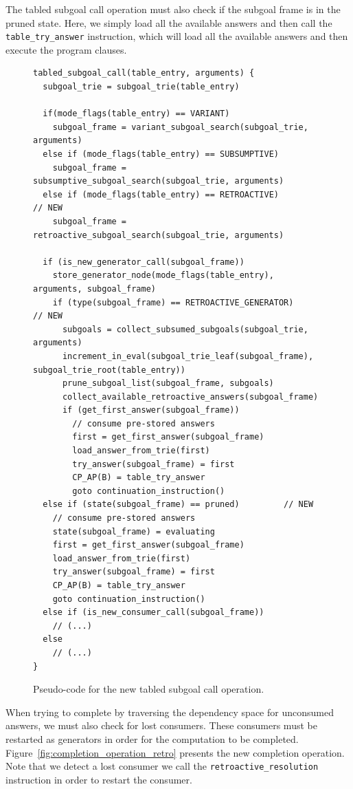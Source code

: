The tabled subgoal call operation must also check if the subgoal frame is in the pruned state. Here,
we simply load all the available answers and then call the \texttt{table\_try\_answer} instruction,
which will load all the available answers and then execute the program clauses.

\begin{figure}[ht]
\begin{Verbatim}
tabled_subgoal_call(table_entry, arguments) {
  subgoal_trie = subgoal_trie(table_entry)
  
  if(mode_flags(table_entry) == VARIANT)
    subgoal_frame = variant_subgoal_search(subgoal_trie, arguments)
  else if (mode_flags(table_entry) == SUBSUMPTIVE)
    subgoal_frame = subsumptive_subgoal_search(subgoal_trie, arguments)
  else if (mode_flags(table_entry) == RETROACTIVE)                 // NEW
    subgoal_frame = retroactive_subgoal_search(subgoal_trie, arguments)
  
  if (is_new_generator_call(subgoal_frame))
    store_generator_node(mode_flags(table_entry), arguments, subgoal_frame)
    if (type(subgoal_frame) == RETROACTIVE_GENERATOR)             // NEW
      subgoals = collect_subsumed_subgoals(subgoal_trie, arguments)
      increment_in_eval(subgoal_trie_leaf(subgoal_frame), subgoal_trie_root(table_entry))
      prune_subgoal_list(subgoal_frame, subgoals)
      collect_available_retroactive_answers(subgoal_frame)
      if (get_first_answer(subgoal_frame))
        // consume pre-stored answers
        first = get_first_answer(subgoal_frame)
        load_answer_from_trie(first)
        try_answer(subgoal_frame) = first
        CP_AP(B) = table_try_answer
        goto continuation_instruction()
  else if (state(subgoal_frame) == pruned)         // NEW
    // consume pre-stored answers
    state(subgoal_frame) = evaluating
    first = get_first_answer(subgoal_frame)
    load_answer_from_trie(first)
    try_answer(subgoal_frame) = first
    CP_AP(B) = table_try_answer
    goto continuation_instruction()
  else if (is_new_consumer_call(subgoal_frame))
    // (...)
  else
    // (...)
}
\end{Verbatim}
\caption{Pseudo-code for the new tabled subgoal call operation.}
\label{fig:tabled_subgoal_call_retro}
\end{figure}

When trying to complete by traversing the dependency space for unconsumed answers, we must
also check for lost consumers. These consumers must be restarted as generators in order for
the computation to be completed. Figure~\ref{fig:completion_operation_retro} presents the new completion
operation. Note that we detect a lost consumer we call the \texttt{retroactive\_resolution}
instruction in order to restart the consumer.

